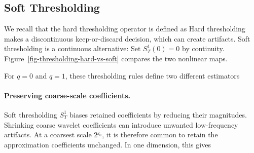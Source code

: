 
\subsection{Soft Thresholding}

We recall that the hard thresholding operator is defined as
Hard thresholding makes a discontinuous keep-or-discard decision, which can create artifacts. Soft thresholding is a continuous alternative:
Set $S_T^1(0)=0$ by continuity. Figure~\ref{fig-thresholding-hard-vs-soft} compares the two nonlinear maps.


For $q=0$ and $q=1$, these thresholding rules define two different estimators



\paragraph{Preserving coarse-scale coefficients.}

Soft thresholding $S_T^1$ biases retained coefficients by reducing their magnitudes.
Shrinking coarse wavelet coefficients can introduce unwanted low-frequency artifacts. At a coarsest scale $2^{j_0}$, it is therefore common to retain the approximation coefficients unchanged. In one dimension, this gives



